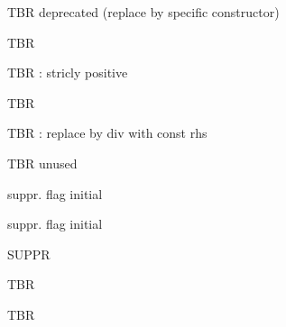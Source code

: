 \begin{DoxyRefList}
%
T\+BR deprecated (replace by specific constructor)  
\item[Member \mbox{\hyperlink{group__general_gac021c39dd4209cc19d4ec5049b3a94ec}{T\+R\+A\+C\+E\+\_\+\+L\+E\+V\+EL}} ]\label{todo__todo000001}%
%
T\+BR  
\item[Member \mbox{\hyperlink{classTropicalWeight_abc00c8fe56beedff6b7192325833d6d3}{Tropical\+Weight::make}} (double v) const]\label{todo__todo000038}%
%
T\+BR \+: stricly positive  
\item[Member \mbox{\hyperlink{group__weight_ga1fa4dd503a5f4915df2f9c5663aeeaeb}{Viterbi\+Weight::invert}} ()]\label{todo__todo000039}%
%
T\+BR  
\item[Member \mbox{\hyperlink{group__weight_gabc3309e134f0fdda38ebbcb12d350a28}{Weight::invert}} ()]\label{todo__todo000040}%
%
T\+BR \+: replace by div with const rhs  
\item[Member \mbox{\hyperlink{group__schemata_ga91e272f4f9463149cd296f48e65a4185}{W\+TA::abstract}} (bool flag=false)]\label{todo__todo000020}%
%
T\+BR unused  
\item[Member \mbox{\hyperlink{group__schemata_ga01de1e03d09518b38ab69a2075276ae2}{W\+TA::add}} (state\+\_\+t, const \mbox{\hyperlink{classTransition}{Transition}} \&, bool initial=false)]\label{todo__todo000019}%
%
suppr. flag initial  
\item[Member \mbox{\hyperlink{group__schemata_ga924a1c533383a7185b9d466b59c5a495}{W\+TA::add}} (state\+\_\+t, bool initial=false)]\label{todo__todo000018}%
%
suppr. flag initial  
\item[Member \mbox{\hyperlink{classWTA_a5d8ace9f515a3902d889db560f08f4c5}{W\+TA::initials}} ]\label{todo__todo000021}%
%
S\+U\+P\+PR  
\item[Member \mbox{\hyperlink{group__schemata_ga88d07a1e47cc3ee537234861b7336dd6}{W\+TA::is\+Initial}} (state\+\_\+t) const]\label{todo__todo000017}%
%
T\+BR  
\item[Member \mbox{\hyperlink{classWTAFile_a1d76575338801558fc75759aa90261b9}{W\+T\+A\+File::W\+T\+A\+File}} (const std\+::string filename, bool count\+\_\+flag=false, bool penalty\+\_\+flag=true, bool stochastic\+\_\+flag=false)]\label{todo__todo000009}%
%
T\+BR 
\end{DoxyRefList}